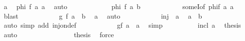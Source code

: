 \begin{isabellebody}
\ a\ \isamarkupfalse%
\ {\isachardoublequoteopen}{\isacharquery}{\kern0pt}phi\ {\isacharparenleft}{\kern0pt}f\ a{\isacharparenright}{\kern0pt}\ a{\isachardoublequoteclose}\ \isamarkupfalse%
\ auto\isanewline
\ \ \ \ \ \ \ \ \isamarkupfalse%
\ \isamarkupfalse%
\ {\isacharasterisk}{\kern0pt}{\isacharcolon}{\kern0pt}\ {\isachardoublequoteopen}{\isacharquery}{\kern0pt}phi\ {\isacharparenleft}{\kern0pt}f\ a{\isacharparenright}{\kern0pt}\ {\isacharquery}{\kern0pt}b{\isachardoublequoteclose}\isanewline
\ \ \ \ \ \ \ \ \ \ \isamarkupfalse%
\ someI{\isacharbrackleft}{\kern0pt}of\ {\isachardoublequoteopen}{\isacharquery}{\kern0pt}phi{\isacharparenleft}{\kern0pt}f\ a{\isacharparenright}{\kern0pt}{\isachardoublequoteclose}\ a{\isacharbrackright}{\kern0pt}\ \isamarkupfalse%
\ blast\isanewline
\ \ \ \ \ \ \ \ \isamarkupfalse%
\ \isamarkupfalse%
\ {\isachardoublequoteopen}{\isacharquery}{\kern0pt}g\ {\isacharparenleft}{\kern0pt}f\ a{\isacharparenright}{\kern0pt}\ {\isacharequal}{\kern0pt}\ {\isacharquery}{\kern0pt}b{\isachardoublequoteclose}\ \isamarkupfalse%
\ a\ \isamarkupfalse%
\ auto\isanewline
\ \ \ \ \ \ \ \ \isamarkupfalse%
\ \isamarkupfalse%
\ inj\ {\isacharasterisk}{\kern0pt}\ a\ \isamarkupfalse%
\ {\isachardoublequoteopen}a\ {\isacharequal}{\kern0pt}\ {\isacharquery}{\kern0pt}b{\isachardoublequoteclose}\isanewline
\ \ \ \ \ \ \ \ \ \ \isamarkupfalse%
\ {\isacharparenleft}{\kern0pt}auto\ simp\ add{\isacharcolon}{\kern0pt}\ inj{\isacharunderscore}{\kern0pt}on{\isacharunderscore}{\kern0pt}def{\isacharparenright}{\kern0pt}\isanewline
\ \ \ \ \ \ \ \ \isamarkupfalse%
\ \isamarkupfalse%
\ {\isachardoublequoteopen}{\isacharquery}{\kern0pt}g{\isacharparenleft}{\kern0pt}f\ a{\isacharparenright}{\kern0pt}\ {\isacharequal}{\kern0pt}\ a{\isachardoublequoteclose}\ \isamarkupfalse%
\ simp\isanewline
\ \ \ \ \ \ \ \ \isamarkupfalse%
\ incl\ a\ \isamarkupfalse%
\ {\isacharquery}{\kern0pt}thesis\ \isamarkupfalse%
\ auto\isanewline
\ \ \ \ \ \ \isamarkupfalse%
\isanewline
\ \ \ \ \ \ \isamarkupfalse%
\ \isamarkupfalse%
\ {\isacharquery}{\kern0pt}thesis\ \isamarkupfalse%
\ force\isanewline
\ \ \ \ \isamarkupfalse%
\isanewline
\ \ \isamarkupfalse%
\isanewline

\end{isabellebody}
